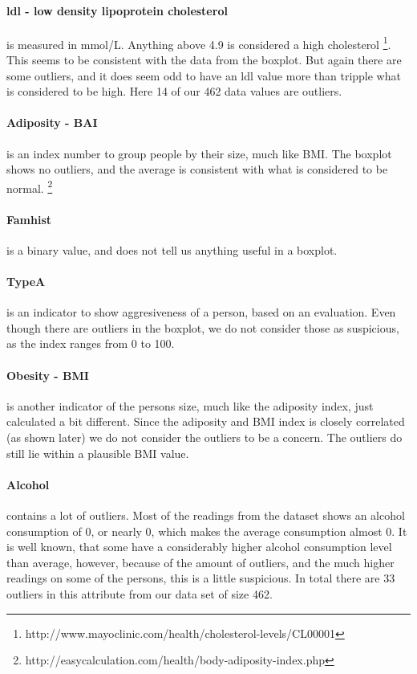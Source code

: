 \paragraph{ldl - low density lipoprotein cholesterol} is measured in mmol/L. Anything above 4.9 is considered a high cholesterol \footnote{http://www.mayoclinic.com/health/cholesterol-levels/CL00001}. This seems to be consistent with the data from the boxplot. But again there are some outliers, and it does seem odd to have an ldl value more than tripple what is considered to be high.
Here 14 of our 462 data values are outliers.%

\paragraph{Adiposity - BAI} is an index number to group people by their size, much like BMI. The boxplot shows no outliers, and the average is consistent with what is considered to be normal. \footnote{http://easycalculation.com/health/body-adiposity-index.php}

\paragraph{Famhist} is a binary value, and does not tell us anything useful in a boxplot.%

\paragraph{TypeA} is an indicator to show aggresiveness of a person, based on an evaluation. Even though there are outliers in the boxplot, we do not consider those as suspicious, as the index ranges from 0 to 100.

\paragraph{Obesity - BMI} is another indicator of the persons size, much like the adiposity index, just calculated a bit different. Since the adiposity and BMI index is closely correlated (as shown later) we do not consider the outliers to be a concern. The outliers do still lie within a plausible BMI value.

\paragraph{Alcohol} contains a lot of outliers. Most of the readings from the dataset shows an alcohol consumption of 0, or nearly 0, which makes the average consumption almost 0. It is well known, that some have a considerably higher alcohol consumption level than average, however, because of the amount of outliers, and the much higher readings on some of the persons, this is a little suspicious.
In total there are 33 outliers in this attribute from our data set of size 462.

